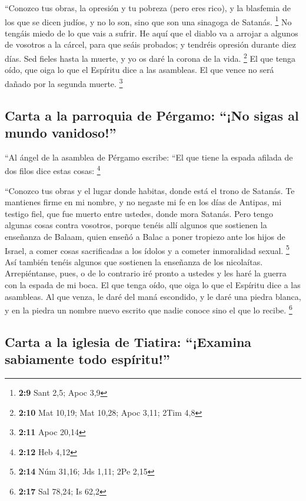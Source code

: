 \begin{paracol}{2}
 ``Conozco tus obras, la opresión y tu pobreza (pero eres
rico), y la blasfemia de los que se dicen judíos, y no lo son, sino que
son una sinagoga de Satanás. \footnote{\textbf{2:9} Sant 2,5; Apoc 3,9}
 No tengáis miedo de lo que vais a sufrir. He aquí que el
diablo va a arrojar a algunos de vosotros a la cárcel, para que seáis
probados; y tendréis opresión durante diez días. Sed fieles hasta la
muerte, y yo os daré la corona de la vida. \footnote{\textbf{2:10} Mat
  10,19; Mat 10,28; Apoc 3,11; 2Tim 4,8}  El que tenga
oído, que oiga lo que el Espíritu dice a las asambleas. El que vence no
será dañado por la segunda muerte. \footnote{\textbf{2:11} Apoc 20,14}

\hypertarget{carta-a-la-parroquia-de-puxe9rgamo-no-sigas-al-mundo-vanidoso}{%
\subsection{Carta a la parroquia de Pérgamo: ``¡No sigas al mundo
vanidoso!''}\label{carta-a-la-parroquia-de-puxe9rgamo-no-sigas-al-mundo-vanidoso}}

 ``Al ángel de la asamblea de Pérgamo escribe: ``El que
tiene la espada afilada de dos filos dice estas cosas: \footnote{\textbf{2:12}
  Heb 4,12}

 ``Conozco tus obras y el lugar donde habitas, donde está
el trono de Satanás. Te mantienes firme en mi nombre, y no negaste mi fe
en los días de Antipas, mi testigo fiel, que fue muerto entre ustedes,
donde mora Satanás.  Pero tengo algunas cosas contra
vosotros, porque tenéis allí algunos que sostienen la enseñanza de
Balaam, quien enseñó a Balac a poner tropiezo ante los hijos de Israel,
a comer cosas sacrificadas a los ídolos y a cometer inmoralidad sexual.
\footnote{\textbf{2:14} Núm 31,16; Jds 1,11; 2Pe 2,15} 
Así también tenéis algunos que sostienen la enseñanza de los nicolaítas.
 Arrepiéntanse, pues, o de lo contrario iré pronto a
ustedes y les haré la guerra con la espada de mi boca. 
El que tenga oído, que oiga lo que el Espíritu dice a las asambleas. Al
que venza, le daré del maná escondido, y le daré una piedra blanca, y en
la piedra un nombre nuevo escrito que nadie conoce sino el que lo
recibe. \footnote{\textbf{2:17} Sal 78,24; Is 62,2}

\hypertarget{carta-a-la-iglesia-de-tiatira-examina-sabiamente-todo-espuxedritu}{%
\subsection{Carta a la iglesia de Tiatira: ``¡Examina sabiamente todo
espíritu!''}\label{carta-a-la-iglesia-de-tiatira-examina-sabiamente-todo-espuxedritu}}


\end{paracol}
